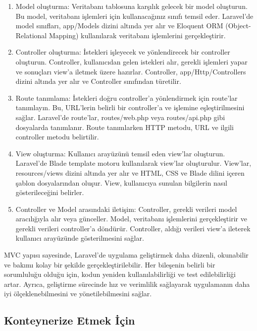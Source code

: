 \begin{enumerate}
\item Model oluşturma:
Veritabanı tablosuna karşılık gelecek bir model oluşturun. Bu model, veritabanı işlemleri için kullanacağınız sınıfı temsil eder. Laravel'de model sınıfları, app/Models dizini altında yer alır ve Eloquent ORM (Object-Relational Mapping) kullanılarak veritabanı işlemlerini gerçekleştirir.

\item Controller oluşturma:
İstekleri işleyecek ve yönlendirecek bir controller oluşturun. Controller, kullanıcıdan gelen istekleri alır, gerekli işlemleri yapar ve sonuçları view'a iletmek üzere hazırlar. Controller, app/Http/Controllers dizini altında yer alır ve Controller sınıfından türetilir.

\item Route tanımlama:
İstekleri doğru controller'a yönlendirmek için route'lar tanımlayın. Bu, URL'lerin belirli bir controller'a ve işlemine eşleştirilmesini sağlar. Laravel'de route'lar, routes/web.php veya routes/api.php gibi dosyalarda tanımlanır. Route tanımlarken HTTP metodu, URL ve ilgili controller metodu belirtilir.

\item View oluşturma:
Kullanıcı arayüzünü temsil eden view'lar oluşturun. Laravel'de Blade template motoru kullanılarak view'lar oluşturulur. View'lar, resources/views dizini altında yer alır ve HTML, CSS ve Blade dilini içeren şablon dosyalarından oluşur. View, kullanıcıya sunulan bilgilerin nasıl gösterileceğini belirler.

\item Controller ve Model arasındaki iletişim:
Controller, gerekli verileri model aracılığıyla alır veya günceller. Model, veritabanı işlemlerini gerçekleştirir ve gerekli verileri controller'a döndürür. Controller, aldığı verileri view'a ileterek kullanıcı arayüzünde gösterilmesini sağlar.
\end{enumerate}

MVC yapısı sayesinde, Laravel'de uygulama geliştirmek daha düzenli, okunabilir ve bakımı kolay bir şekilde gerçekleştirilebilir. Her bileşenin belirli bir sorumluluğu olduğu için, kodun yeniden kullanılabilirliği ve test edilebilirliği artar. Ayrıca, geliştirme sürecinde hız ve verimlilik sağlayarak uygulamanın daha iyi ölçeklenebilmesini ve yönetilebilmesini sağlar.

\subsection{Konteynerize Etmek İçin  }
